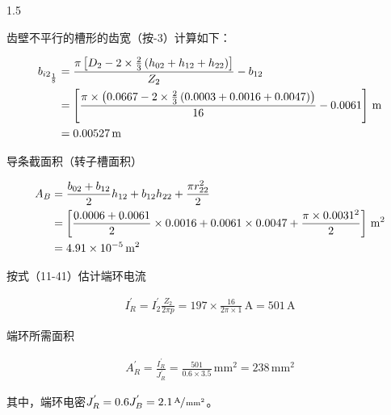 \documentclass[a4paper,11pt]{ctexart}
\newcommand{\A}{\,\text{A}}
\newcommand{\m}{\,\text{m}}
\newcommand{\mm}{\,\text{mm}}
\newenvironment{shrinkeq}[2]
{
	\bgroup
	\addtolength\abovedisplayshortskip{#1}
	\addtolength\abovedisplayskip{#1}
	\addtolength\belowdisplayshortskip{#2}
	\addtolength\belowdisplayskip{#2}
}
{
	\egroup
	\ignorespacesafterend
}
\begin{document}
\begin{spacing}{1.5}
\par
齿壁不平行的槽形的齿宽（按-3）计算如下：
\begin{shrinkeq}{-1ex}{-1ex}
	\begin{align}
	b_{i2_{\frac{1}{8}}} &= \frac{\pi\left[D_2-2\times\frac{2}{3}\left(h_{02}+h_{12}+h_{22}\right)\right]}{Z_2}-b_{12} \\
	&=\left[\frac{\pi\times\left(0.0667 - 2\times\frac{2}{3}\left(0.0003+0.0016+0.0047\right)  \right)}{16}-0.0061 \right]\m\notag\\ 
	&= 0.00527\m \notag
	\end{align}
\end{shrinkeq}
导条截面积（转子槽面积）
\begin{shrinkeq}{-1ex}{-1ex}
	\begin{align}
	A_{B} &= \frac{b_{02}+b_{12}}{2}h_{12}+b_{12}h_{22}+\frac{\pi r_{22}^{2}}{2} \\
	&=\left[\frac{0.0006+0.0061}{2}\times 0.0016 +0.0061 \times 0.0047 +
	\frac{\pi\times 0.0031^2}{2}\right]\m^2 \notag\\
	&= 4.91\times 10^{-5}\m^2\notag
	\end{align}
\end{shrinkeq}
\par
按式（11-41）估计端环电流
\begin{shrinkeq}{-1ex}{-1ex}
	\begin{align}
	I_{R}^{'}=I_{2}^{'}\frac{Z_2}{2\pi p} = 197\times \frac{16}{2\pi\times 1}\A = 501\A
	\end{align}
\end{shrinkeq}
\par
端环所需面积
\begin{shrinkeq}{-1ex}{-1ex}
	\begin{align}
	A_{R}^{'} = \frac{I_{R}^{'}}{J_{R}^{'}} = \frac{501}{0.6\times 3.5}\mm^2 = 238\mm^2
	\end{align}
\end{shrinkeq}
其中，端环电密$J_{R}^{'} = 0.6 J_{B}^{'} =2.1 \sfrac{\A}{\mm^2}$。


\end{spacing}
\end{document}
